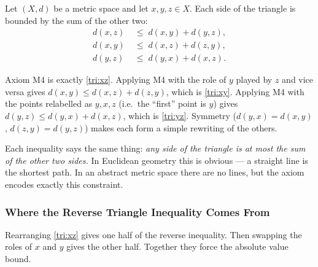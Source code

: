 
\begin{proposition}
\label{prop:triangle-three-forms}
Let $(X,d)$ be a metric space and let $x,y,z\in X$.
Each side of the triangle is bounded by the sum of the other two:
\begin{align}
d(x,z) &\;\le\; d(x,y) + d(y,z), \label{tri:xz} \\
d(x,y) &\;\le\; d(x,z) + d(z,y), \label{tri:xy} \\
d(y,z) &\;\le\; d(y,x) + d(x,z). \label{tri:yz}
\end{align}
\end{proposition}

\begin{remark*}
Axiom M4 is exactly \eqref{tri:xz}.
Applying M4 with the role of $y$ played by $z$ and vice versa gives
$d(x,y) \le d(x,z)+d(z,y)$, which is \eqref{tri:xy}.
Applying M4 with the points relabelled as $y,x,z$ (i.e.\ the ``first''
point is $y$) gives $d(y,z)\le d(y,x)+d(x,z)$, which is \eqref{tri:yz}.
Symmetry ($d(y,x)=d(x,y)$, $d(z,y)=d(y,z)$) makes each form a simple
rewriting of the others.
\end{remark*}

\begin{remark*}
Each inequality says the same thing: \emph{any side of the triangle is
at most the sum of the other two sides.}
In Euclidean geometry this is obvious --- a straight line is the shortest
path.
In an abstract metric space there are no lines, but the axiom encodes
exactly this constraint.
\end{remark*}


\subsubsection*{Where the Reverse Triangle Inequality Comes From}

Rearranging \eqref{tri:xz} gives one half of the reverse inequality.
Then swapping the roles of $x$ and $y$ gives the other half.
Together they force the absolute value bound.


